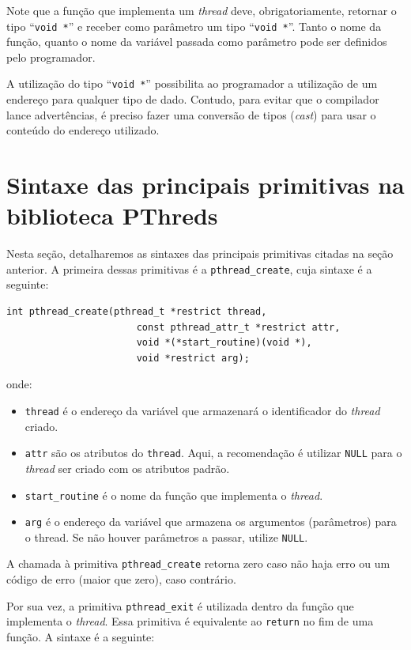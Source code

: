 Note que a função que implementa um \textit{thread} deve, obrigatoriamente, retornar o tipo \enquote{\mbox{\texttt{void *}}} e receber como parâmetro um tipo \enquote{\mbox{\texttt{void *}}}. Tanto o nome da função, quanto o nome da variável passada como parâmetro pode ser definidos pelo programador.

A utilização do tipo \enquote{\mbox{\texttt{void *}}} possibilita ao programador a utilização de um endereço para qualquer tipo de dado. Contudo, para evitar que o compilador lance advertências, é preciso fazer uma conversão de tipos (\textit{cast}) para usar o conteúdo do endereço utilizado.

\section{Sintaxe das principais primitivas na biblioteca PThreds}

Nesta seção, detalharemos as sintaxes das principais primitivas citadas na seção anterior. A primeira dessas primitivas é a \texttt{pthread\_create}, cuja sintaxe é a seguinte:

\begin{lstlisting}[style=MyCStyle, frame=none, numbers=none]
    int pthread_create(pthread_t *restrict thread,
                       const pthread_attr_t *restrict attr,
                       void *(*start_routine)(void *),
                       void *restrict arg);
\end{lstlisting}
 
onde: 
\begin{itemize}
    \item \texttt{thread} é o endereço da variável que armazenará o identificador do \textit{thread} criado.
    \item \texttt{attr} são os atributos do \texttt{thread}. Aqui, a recomendação é utilizar \texttt{NULL} para o \textit{thread} ser criado com os atributos padrão. 
    \item \texttt{start\_routine} é o nome da função que implementa o \textit{thread}.
    \item \texttt{arg} é o endereço da variável que armazena os argumentos (parâmetros) para o thread. Se não houver parâmetros a passar, utilize \texttt{NULL}.
 \end{itemize}

A chamada à primitiva \texttt{pthread\_create} retorna zero caso não haja erro ou um código de erro (maior que zero), caso contrário.

Por sua vez, a primitiva \texttt{pthread\_exit} é utilizada dentro da função que implementa o \textit{thread}. Essa primitiva é equivalente ao \texttt{return} no fim de uma função. A sintaxe é a seguinte:

